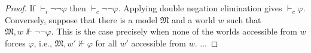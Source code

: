 \documentclass[a4paper]{article}
\newcommand{\M}{\mathfrak{M}}
\begin{document}
\section{}
\label{sec:4}

\begin{proof}
  If $\vdash_i \lnot\lnot \varphi$ then $\vdash_c \lnot\lnot \varphi$.
  Applying double negation elimination gives $\vdash_c \varphi$.
  Conversely, suppose that there is a model $\M$ and a world $w$ such that $\M,w \nVdash \lnot\lnot \varphi$.
  This is the case precisely when none of the worlds accessible from $w$ forces $\varphi$, i.e., $\M,w' \nVdash \varphi$ for all $w'$ accessible from $w$.
  ...
\end{proof}

\end{document}
